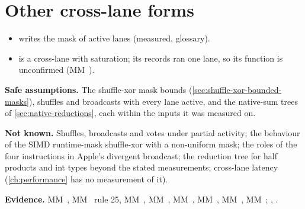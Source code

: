 \section{Other cross-lane forms}\label{sec:other-cross-lane-forms}

\begin{itemize}
\item {} writes the mask of active lanes (measured, glossary).
\item {} is a cross-lane  with saturation; its records ran one lane, so its function is
  unconfirmed (MM~).
\end{itemize}

\textbf{Safe assumptions.} The shuffle-xor mask bounds (\cref{sec:shuffle-xor-bounded-masks}), shuffles and broadcasts with
every lane active, and the native-sum trees of \cref{sec:native-reductions}, each within the inputs it was measured on.

\textbf{Not known.} Shuffles, broadcasts and votes under partial activity; the behaviour of the SIMD runtime-mask
shuffle-xor with a non-uniform mask; the roles of the four instructions in Apple's divergent broadcast; the reduction tree for half  products and
int types beyond the stated measurements; cross-lane latency (\cref{ch:performance} has no measurement of it).

\textbf{Evidence.} MM~, MM~ rule 25, MM~, MM~, MM~, MM~, MM~, MM~;
, .
